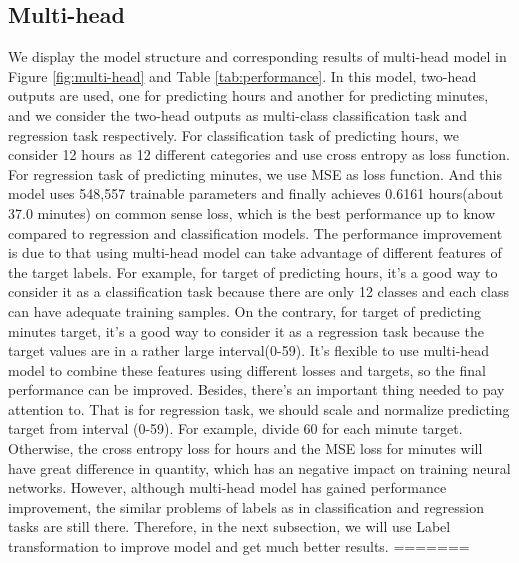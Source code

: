 \documentclass{article}
\begin{document}
\subsection{Multi-head}
We display the model structure and corresponding results of multi-head model in Figure \ref{fig:multi-head} and Table \ref{tab:performance}. In this model, two-head outputs are used, one for predicting hours and another for predicting minutes, and we consider the two-head outputs as multi-class classification task and regression task respectively. For classification task of predicting hours, we consider 12 hours as 12 different categories and use cross entropy as loss function. For regression task of predicting minutes, we use MSE as loss function. And this model uses 548,557 trainable parameters and finally achieves 0.6161 hours(about 37.0 minutes) on common sense loss, which is the best performance up to know compared to regression and classification models. The performance improvement is due to that using multi-head model can take advantage of different features of the target labels. For example, for target of predicting hours, it's a good way to consider it as a classification task because there are only 12 classes and each class can have adequate training samples. On the contrary, for target of predicting minutes target, it's a good way to consider it as a regression task because the target values are in a rather large interval(0-59). It's flexible to use multi-head model to combine these features using different losses and targets, so the final performance can be improved. Besides, there's an important thing needed to pay attention to. That is for regression task, we should scale and normalize predicting target from interval (0-59). For example, divide 60 for each minute target. Otherwise, the cross entropy loss for hours and the MSE loss for minutes will have great difference in quantity, which has an negative impact on training neural networks. However, although multi-head model has gained performance improvement, the similar problems of labels as in classification and regression tasks are still there. Therefore, in the next subsection, we will use Label transformation to improve model and get much better results.
=======
\end{document}
